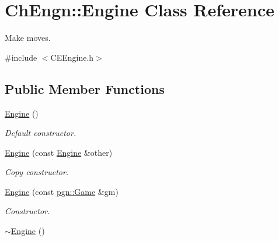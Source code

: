 \hypertarget{classChEngn_1_1Engine}{
\section{ChEngn::Engine Class Reference}
\label{classChEngn_1_1Engine}
}


Make moves.  




{\ttfamily \#include $<$CEEngine.h$>$}

\subsection*{Public Member Functions}
\begin{DoxyCompactItemize}
\item 
\hypertarget{classChEngn_1_1Engine_a2bd4b075e86d94d94f3ea97c680b302e}{
\hyperlink{classChEngn_1_1Engine_a2bd4b075e86d94d94f3ea97c680b302e}{Engine} ()}
\label{classChEngn_1_1Engine_a2bd4b075e86d94d94f3ea97c680b302e}

\begin{DoxyCompactList}\small\item\em Default constructor. \item\end{DoxyCompactList}\item 
\hyperlink{classChEngn_1_1Engine_ab92c015fc819dc2b7c51cccbc7878002}{Engine} (const \hyperlink{classChEngn_1_1Engine}{Engine} \&other)
\begin{DoxyCompactList}\small\item\em Copy constructor. \item\end{DoxyCompactList}\item 
\hyperlink{classChEngn_1_1Engine_a1184e133eae1f7e23bf405302fa9f53c}{Engine} (const \hyperlink{classpgn_1_1Game}{pgn::Game} \&gm)
\begin{DoxyCompactList}\small\item\em Constructor. \item\end{DoxyCompactList}\item 
\hypertarget{classChEngn_1_1Engine_a8c4cadb1d68d9f3f9ad5ca03d3353a34}{
\hyperlink{classChEngn_1_1Engine_a8c4cadb1d68d9f3f9ad5ca03d3353a34}{$\sim$Engine} ()}
\label{classChEngn_1_1Engine_a8c4cadb1d68d9f3f9ad5ca03d3353a34}


\end{DoxyCompactItemize}
